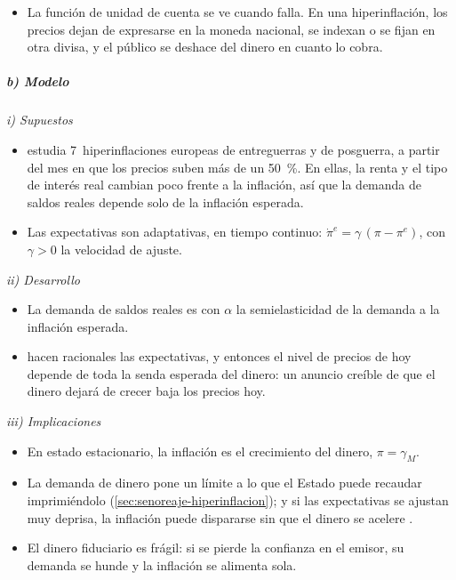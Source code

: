 \documentclass[11pt]{article}
\begin{document}
\begin{itemize}
\item La función de unidad de cuenta se ve cuando falla. En una hiperinflación, los precios dejan de expresarse en la moneda nacional, se indexan o se fijan en otra divisa, y el público se deshace del dinero en cuanto lo cobra.
\end{itemize}

\subparagraph{b) Modelo}

\hspace*{3.6em}\emph{i) Supuestos}

\begin{itemize}
\item \textcite{Cagan1956Monetary} estudia 7~hiperinflaciones europeas de entreguerras y de posguerra, a partir del mes en que los precios suben más de un 50~\%. En ellas, la renta y el tipo de interés real cambian poco frente a la inflación, así que la demanda de saldos reales depende solo de la inflación esperada.
\item Las expectativas son adaptativas, en tiempo continuo: $\dot\pi^e=\gamma\,(\pi-\pi^e)$, con $\gamma>0$ la velocidad de ajuste.
\end{itemize}

\hspace*{3.6em}\emph{ii) Desarrollo}

\begin{itemize}
\item La demanda de saldos reales es
  con $\alpha$ la semielasticidad de la demanda a la inflación esperada.
\item \textcite{SargentWallace1973Rational} hacen racionales las expectativas, y entonces el nivel de precios de hoy depende de toda la senda esperada del dinero: un anuncio creíble de que el dinero dejará de crecer baja los precios hoy.
\end{itemize}

\hspace*{3.6em}\emph{iii) Implicaciones}

\begin{itemize}
\item En estado estacionario, la inflación es el crecimiento del dinero, $\pi=\gamma_M$.
\item La demanda de dinero pone un límite a lo que el Estado puede recaudar imprimiéndolo (\ref{sec:senoreaje-hiperinflacion}); y si las expectativas se ajustan muy deprisa, la inflación puede dispararse sin que el dinero se acelere .
\item El dinero fiduciario es frágil: si se pierde la confianza en el emisor, su demanda se hunde y la inflación se alimenta sola.
\end{itemize}
\end{document}
